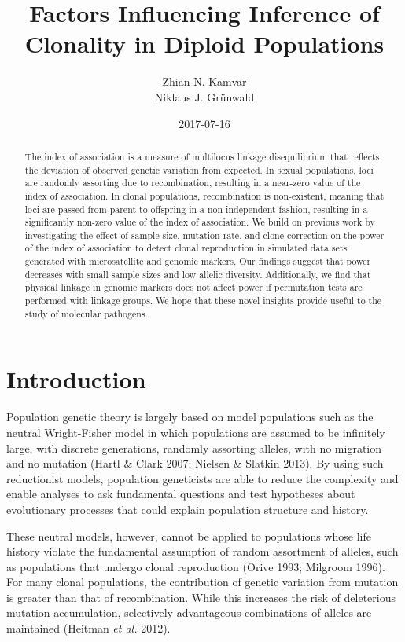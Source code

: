 \documentclass[]{article}
\title{Factors Influencing Inference of Clonality in Diploid Populations}
\author{Zhian N. Kamvar \\ Niklaus J. Grünwald}
\date{2017-07-16}
\theoremstyle{definition}
\theoremstyle{definition}
\theoremstyle{remark}
\begin{document}
\maketitle
\begin{abstract}
The index of association is a measure of multilocus linkage
disequilibrium that reflects the deviation of observed genetic variation
from expected. In sexual populations, loci are randomly assorting due to
recombination, resulting in a near-zero value of the index of
association. In clonal populations, recombination is non-existent,
meaning that loci are passed from parent to offspring in a
non-independent fashion, resulting in a significantly non-zero value of
the index of association. We build on previous work by investigating the
effect of sample size, mutation rate, and clone correction on the power
of the index of association to detect clonal reproduction in simulated
data sets generated with microsatellite and genomic markers. Our
findings suggest that power decreases with small sample sizes and low
allelic diversity. Additionally, we find that physical linkage in
genomic markers does not affect power if permutation tests are performed
with linkage groups. We hope that these novel insights provide useful to
the study of molecular pathogens.
\end{abstract}

\section{Introduction}\label{introduction}

Population genetic theory is largely based on model populations such as
the neutral Wright-Fisher model in which populations are assumed to be
infinitely large, with discrete generations, randomly assorting alleles,
with no migration and no mutation (Hartl \& Clark 2007; Nielsen \&
Slatkin 2013). By using such reductionist models, population geneticists
are able to reduce the complexity and enable analyses to ask fundamental
questions and test hypotheses about evolutionary processes that could
explain population structure and history.

These neutral models, however, cannot be applied to populations whose
life history violate the fundamental assumption of random assortment of
alleles, such as populations that undergo clonal reproduction (Orive
1993; Milgroom 1996). For many clonal populations, the contribution of
genetic variation from mutation is greater than that of recombination.
While this increases the risk of deleterious mutation accumulation,
selectively advantageous combinations of alleles are maintained (Heitman
\emph{et al.} 2012).
\end{document}

